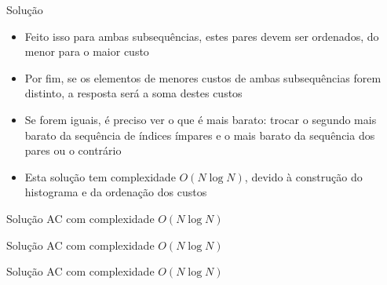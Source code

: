 \begin{frame}[fragile]{Solução}

    \begin{itemize}
        \item Feito isso para ambas subsequências, estes pares devem ser ordenados, do menor para
            o maior custo

        \item Por fim, se os elementos de menores custos de ambas subsequências forem distinto,
            a resposta será a soma destes custos

        \item Se forem iguais, é preciso ver o que é mais barato: trocar o segundo mais barato
            da sequência de índices ímpares e o mais barato da sequência dos pares ou o 
            contrário

        \item Esta solução tem complexidade $O(N\log N)$, devido à construção do histograma e
            da ordenação dos custos
    \end{itemize}

\end{frame}


\begin{frame}[fragile]{Solução AC com complexidade $O(N\log N)$}
\end{frame}

\begin{frame}[fragile]{Solução AC com complexidade $O(N\log N)$}
\end{frame}

\begin{frame}[fragile]{Solução AC com complexidade $O(N\log N)$}
\end{frame}

